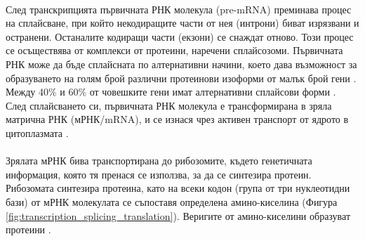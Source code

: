 \documentclass[pdftex,cyrillic,14pt,a4page,twoside,openright]{extreport}
\begin{document}
\paragraph{}
След транскрипцията първичната РНК молекула (pre-mRNA) преминава процес на сплайсване, при който некодиращите части от нея (интрони) биват изрязвани и остранени. Останалите кодиращи части (екзони) се снаждат отново. Този процес се осъществява от комплекси от протеини, наречени сплайсозоми. Първичната РНК може да бъде сплайсната по алтернативни начини, което дава възможност за образуването на голям брой различни протеинови изоформи от малък брой гени \cite{stamm2005}. Между 40\% и 60\% от човешките гени имат алтернативни сплайсови форми \cite{modrek2002}. След сплайсването си, първичната РНК молекула е трансформирана в зряла матрична РНК (мРНК/mRNA), и се изнася чрез активен транспорт от ядрото в цитоплазмата \cite{siebrasse2012}.

\paragraph{}
Зрялата мРНК бива транспортирана до рибозомите, където генетичната информация, която тя пренася се използва, за да се синтезира протеин. Рибозомата синтезира протеина, като на всеки кодон (група от три нуклеотидни бази) от мРНК молекулата се съпоставя определена амино-киселина (Фигура \ref{fig:transcription_splicing_translation}). Веригите от амино-киселини образуват протеини \cite{klug2014translation}.
\end{document}
